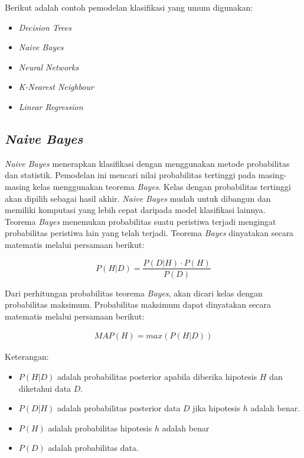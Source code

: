 \noindent Berikut adalah contoh pemodelan klasifikasi yang umum digunakan:
\begin{itemize}
\item \textit{Decision Trees}
\item \textit{Naive Bayes}
\item \textit{Neural Networks}
\item \textit{K-Nearest Neighbour}
\item \textit{Linear Regression}
\end{itemize}

\subsection{\textit{Naive Bayes}}
\label{sec:naive_bayes}
\par \textit{Naive Bayes} menerapkan klasifikasi dengan menggunakan metode probabilitas dan statistik. Pemodelan ini mencari nilai probabilitas tertinggi pada masing-masing kelas menggunakan teorema \textit{Bayes}. Kelas dengan probabilitas tertinggi akan dipilih sebagai hasil akhir. \textit{Naive Bayes} mudah untuk dibangun dan memiliki komputasi yang lebih cepat daripada model klasifikasi lainnya.\\

\noindent Teorema \textit{Bayes} menemukan probabilitas suatu peristiwa terjadi mengingat probabilitas peristiwa lain yang telah terjadi. Teorema \textit{Bayes} dinyatakan secara matematis melalui persamaan berikut:

\begin{equation}
P(H|D) = \frac{P(D|H) \cdot P(H)}{P(D)}
\end{equation}

\noindent
Dari perhitungan probabilitas teorema \textit{Bayes}, akan dicari kelas dengan probabilitas maksimum. Probabilitas maksimum dapat dinyatakan secara matematis melalui persamaan berikut:

\begin{align}
MAP(H) = max(P(H|D))
\end{align}

\noindent Keterangan:
\begin{itemize}
\item $P(H|D)$ adalah probabilitas posterior apabila diberika hipotesis $H$ dan diketahui data $D$. 
\item $P(D|H)$ adalah probabilitas posterior data $D$ jika hipotesis $h$ adalah benar.
\item $P(H)$ adalah probabilitas hipotesis $h$ adalah benar 
\item $P(D)$ adalah probabilitas data.
\end{itemize}

